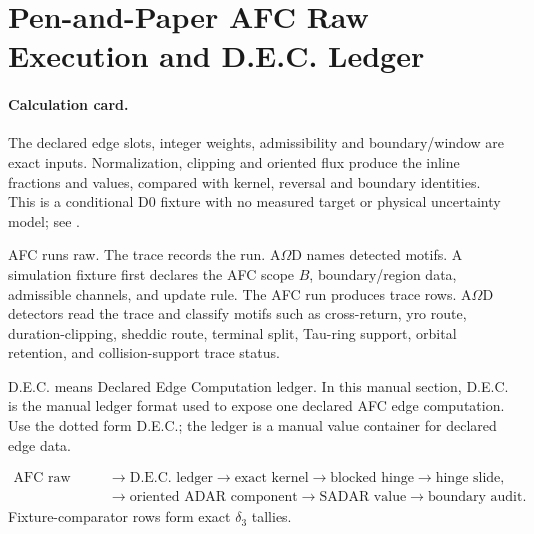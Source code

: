 
\section{Pen-and-Paper AFC Raw Execution and D.E.C. Ledger}\label{manual:dec-ledger}

\paragraph{Calculation card.}
The declared edge slots, integer weights, admissibility and boundary/window
are exact inputs. Normalization, clipping and oriented flux produce the
inline fractions and values, compared with kernel, reversal and boundary
identities. This is a conditional D0 fixture with no measured target or
physical uncertainty model; see .



AFC runs raw. The trace records the run. A\(\Omega\)D names detected motifs. A simulation fixture first declares the AFC scope \(B\), boundary/region data, admissible channels, and update rule. The AFC run produces trace rows. A\(\Omega\)D detectors read the trace and classify motifs such as cross-return, yro route, duration-clipping, sheddic route, terminal split, Tau-ring support, orbital retention, and collision-support trace status.

D.E.C. means Declared Edge Computation ledger. In this manual section, D.E.C. is the manual ledger format used to expose one declared AFC edge computation. Use the dotted form D.E.C.; the ledger is a manual value container for declared edge data.

\[
\begin{aligned}
\text{AFC raw node}
&\to \text{D.E.C. ledger}
\to \text{exact kernel}
\to \text{blocked hinge}
\to \text{hinge slide},\\
&\to \text{oriented ADAR component}
\to \text{SADAR value}
\to \text{boundary audit}.
\end{aligned}
\]
Fixture-comparator rows form exact \(\delta_3\) tallies.

